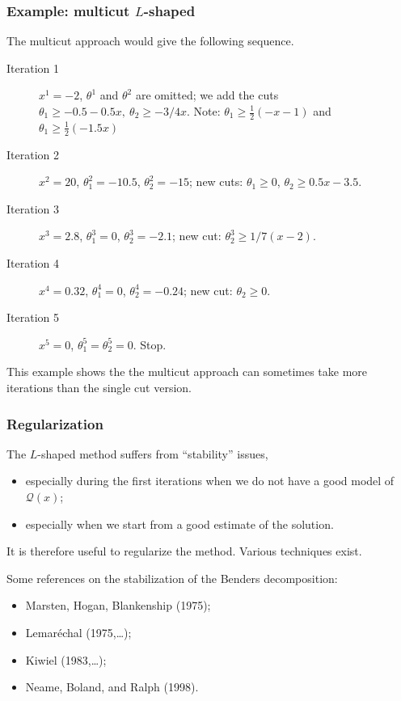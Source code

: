 \documentclass{beamer}
\begin{document}
\begin{frame}
\frametitle{Example: multicut $L$-shaped}

The multicut approach would give the following sequence.
\begin{description}
\item[Iteration 1] $x^1 = -2$, $\theta^1$ and $\theta^2$ are omitted;
we add the cuts $\theta_1 \geq -0.5 - 0.5x,\ \theta_2 \geq -3/4x$.
Note: $\theta_1 \geq \frac{1}{2} (-x-1)$ and $\theta_1 \geq \frac{1}{2} (-1.5x)$
\item[Iteration 2] $x^2 = 20$, $\theta_1^2 = -10.5$, $\theta_2^2 =
-15$; new cuts: $\theta_1 \geq 0$, $\theta_2 \geq 0.5x - 3.5$.
\item[Iteration 3] $x^3 = 2.8$, $\theta_1^3 = 0$, $\theta_2^3 = -2.1$;
new cut: $\theta_2^3 \geq 1/7(x-2)$.
\item[Iteration 4] $x^4 = 0.32$, $\theta_1^4 = 0$, $\theta_2^4 =
-0.24$; new cut: $\theta_2 \geq 0$.
\item[Iteration 5] $x^5 = 0$, $\theta_1^5 = \theta_2^5 = 0$. Stop.
\end{description}

\mbox{}

This example shows the the multicut approach can sometimes take more iterations than the single cut version.

\end{frame}

\begin{frame}
\frametitle{Regularization}

The $L$-shaped method suffers from ``stability'' issues,
\begin{itemize}
\item
especially during the first iterations when we do not have a good model of $\mathcal{Q}(x)$;
\item
especially when we start from a good estimate of the solution.
\end{itemize}
It is therefore useful to {\red regularize} the method. Various techniques exist.

\mbox{}

{\blue Some references} on the stabilization of the Benders decomposition:
\begin{itemize}
\item
Marsten, Hogan, Blankenship (1975);
\item
Lemaréchal (1975,\ldots);
\item
Kiwiel (1983,\ldots);
\item
Neame, Boland, and Ralph (1998).
\end{itemize}

\end{frame}
\end{document}
